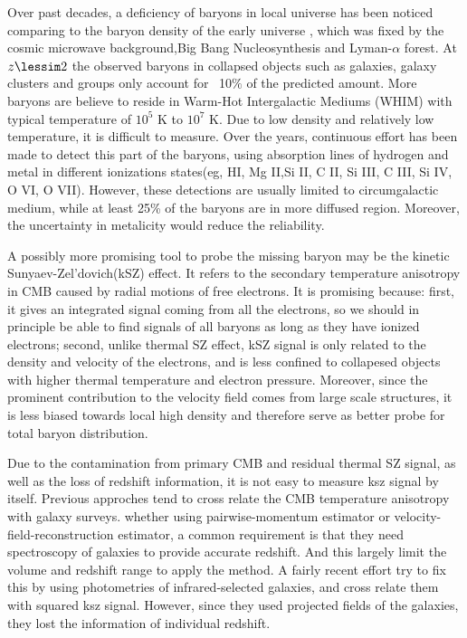 \indent
Over past decades, a deficiency of baryons in local universe has been noticed comparing to the
baryon density of the early universe , which was fixed by the cosmic microwave background,Big Bang Nucleosynthesis and Lyman-$\alpha$ forest\cite{Cook14}\cite{Fukugita98}\cite{Komatsu11}\cite{Hinshaw13}.
At $z\lessim 2$ the observed baryons in collapsed
objects such as galaxies, galaxy clusters and groups only account for ~10$\%$ of the predicted amount.
More baryons are believe to reside in Warm-Hot Intergalactic Mediums (WHIM) with typical temperature of $10^5$ K to $10^7$ K\cite{Soltan06}.
Due to low density and relatively low temperature, it is difficult to measure.
Over the years, continuous effort has been made to detect this part of the baryons, using absorption lines of hydrogen and metal in different ionizations states(eg, HI, Mg II,Si II, C II, Si III, C III, Si IV, O VI, O VII).\cite{Salucci99}\cite{Werk}
However, these detections are usually limited to circumgalactic medium, while at least 25\% of the baryons are in more diffused region\cite{Dave2010}. Moreover, the uncertainty in metalicity would reduce the reliability.

A possibly more promising tool to probe the missing baryon may be the kinetic Sunyaev-Zel'dovich(kSZ) effect\cite{Sunyae72}\cite{Sunyaev80}. 
It refers to the secondary temperature anisotropy in CMB caused by radial motions of free electrons.
It is promising because: first, it gives an integrated signal coming from all the electrons, 
so we should in principle be able to find signals of all baryons as long as they have ionized electrons; 
second, unlike thermal SZ effect, kSZ signal is only related to the density and velocity of the electrons, and is less confined to collapesed objects with higher thermal temperature and electron pressure. 
Moreover, since the prominent contribution to the velocity field comes from large scale structures, it is less biased towards local high density and therefore serve as better probe for total baryon distribution.

Due to the contamination from primary CMB and residual thermal SZ signal, as well as the loss of redshift information, it is not easy to measure ksz signal by itself. 
Previous approches tend to cross relate the CMB temperature anisotropy with galaxy surveys. 
whether using pairwise-momentum estimator\cite{Hand2012} or velocity-field-reconstruction estimator\cite{Shao2011}\cite{Li2014}, 
a common requirement is that they need spectroscopy of galaxies to provide accurate redshift. 
And this largely limit the volume and redshift range to apply the method. 
A fairly recent effort try to fix this by using photometries of infrared-selected galaxies, 
and cross relate them with squared ksz signal. 
However, since they used projected fields of the galaxies, they lost the information of individual redshift\cite{Hill2016}.

